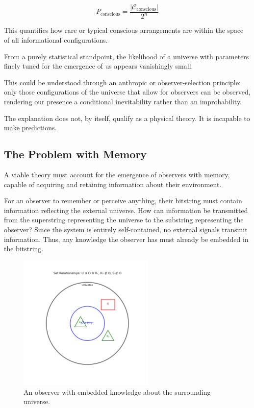 \documentclass[11pt]{article}
\begin{document}
\[
      P_{\text{conscious}} = \frac{|\mathcal{C}_{\text{conscious}}|}{2^n}
\]

This quantifies how rare or typical conscious arrangements are within the space of all informational configurations.

From a purely statistical standpoint, the likelihood of a universe with parameters finely tuned for the emergence of us appears vanishingly small.

This could be understood through an anthropic or observer-selection principle: only those configurations of the universe that allow for observers can be observed, rendering our presence a conditional inevitability rather than an improbability.

The explanation does not, by itself, qualify as a physical theory. It is incapable to make predictions.


\subsection{The Problem with Memory}

A viable theory must account for the emergence of observers with memory, capable of acquiring and retaining information about their environment.

For an observer to remember or perceive anything, their bitstring must contain information reflecting the external universe. How can information be transmitted from the superstring representing the universe to the substring representing the observer?  Since the system is entirely self-contained, no external signals transmit information. Thus, any knowledge the observer has must already be embedded in the bitstring.

\begin{figure}[h!]
      \centering
      \includegraphics[width=0.6\textwidth]{figures/memory.png}
      \caption{An observer with embedded knowledge about the surrounding universe.}
      \label{fig:memory}
\end{figure}
\end{document}

